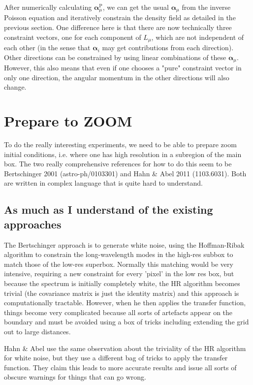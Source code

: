 \documentclass[11pt,a4paper,preprint]{aastex}
\newcommand{\bmath}[1]{\ensuremath{\bm{#1}}}
\renewcommand{\vec}[1]{\bmath{#1}}
\begin{document}
After numerically calculating $\vec{\alpha}_{\mu}^{\mathrm{P}}$, we can get the usual $\vec{\alpha}_{\mu}$ from the inverse Poisson equation and iteratively constrain the density field as detailed in the previous section.
One difference here is that there are now technically three constraint
vectors, one for each component of $L_{\mu}$, which are not
independent of each other (in the sense that $\vec{\alpha}_i$ may get
contributions from each direction). Other directions can be
constrained by using linear combinations of these
$\vec{\alpha}_{\mu}$. However, this also means that even if one
chooses a "pure" constraint vector in only one direction, the angular
momentum in the other directions will also change.


\section{Prepare to ZOOM}

To do the really interesting experiments, we need to be able to
prepare zoom initial conditions, i.e. where one has high resolution in
a subregion of the main box. The two really comprehensive references
for how to do this seem to be Bertschinger 2001 (astro-ph/0103301) and
Hahn \& Abel 2011 (1103.6031). Both are written in complex language
that is quite hard to understand.

\subsection{As much as I understand of the existing approaches}

The Bertschinger approach is to generate white noise, using the
Hoffman-Ribak algorithm to constrain the long-wavelength modes in the
high-res subbox to match those of
the low-res superbox. Normally this matching would be very
intensive, requiring a new constraint for every 'pixel' in the low res
box, but because the spectrum is initially completely white, the HR
algorithm becomes trivial (the covariance matrix is just the identity
matrix) and this approach is computationally tractable. However, when
he then applies the transfer function, things become very complicated
because all sorts of artefacts appear on the boundary and must be
avoided using a box of tricks including extending the grid out to
large distances.

Hahn \& Abel use the same observation about the triviality of the HR
algorithm for white noise, but they use a different bag of tricks to
apply the transfer function. They claim this leads to more accurate
results and issue all sorts of obscure warnings for things that can go
wrong.
\end{document}
